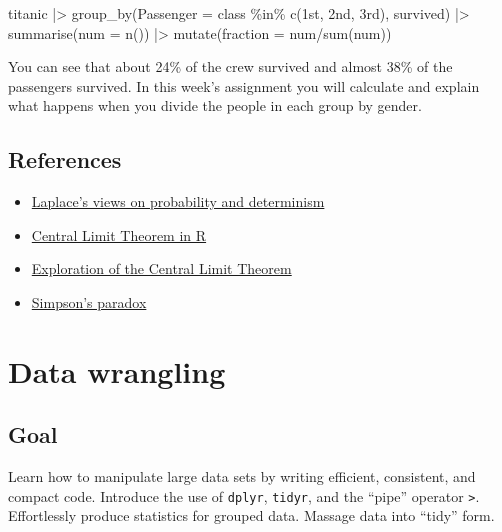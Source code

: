 \documentclass[
  letterpaper,
  DIV=11,
  numbers=noendperiod]{scrreprt}
\newenvironment{Shaded}{\begin{snugshade}}{\end{snugshade}}
\newcommand{\NormalTok}[1]{\textcolor[rgb]{0.00,0.23,0.31}{#1}}
\providecommand{\tightlist}{%
  \setlength{\itemsep}{0pt}\setlength{\parskip}{0pt}}\usepackage{longtable,booktabs,array}
\begin{document}
\begin{Shaded}
\begin{Highlighting}[]
\NormalTok{titanic |\textgreater{} group\_by(Passenger = class \%in\% c(\textquotesingle{}1st\textquotesingle{}, \textquotesingle{}2nd\textquotesingle{}, \textquotesingle{}3rd\textquotesingle{}), survived) |\textgreater{} summarise(num = n()) |\textgreater{} mutate(fraction = num/sum(num)) }
\end{Highlighting}
\end{Shaded}

You can see that about 24\% of the crew survived and almost 38\% of the
passengers survived. In this week's assignment you will calculate and
explain what happens when you divide the people in each group by gender.

\section{References}\label{references}

\begin{itemize}
\tightlist
\item
  \href{https://www.bayesianspectacles.org/laplaces-demon/}{Laplace's
  views on probability and determinism}
\item
  \href{https://medium.com/@ODSC/exploring-the-central-limit-theorem-in-r-e2a2f7091606}{Central
  Limit Theorem in R}
\item
  \href{https://genomicsclass.github.io/book/pages/clt_in_practice.html}{Exploration
  of the Central Limit Theorem}
\item
  \href{https://medium.com/@nikhilborkar/the-simpsons-paradox-and-where-to-find-them-cfcec6c2d8b3}{Simpson's
  paradox}
\end{itemize}


\chapter{Data wrangling}\label{data-wrangling}

\section{Goal}\label{goal-2}

Learn how to manipulate large data sets by writing efficient,
consistent, and compact code. Introduce the use of \texttt{dplyr},
\texttt{tidyr}, and the ``pipe'' operator
\texttt{\textbar{}\textgreater{}}. Effortlessly produce statistics for
grouped data. Massage data into ``tidy'' form.
\end{document}
